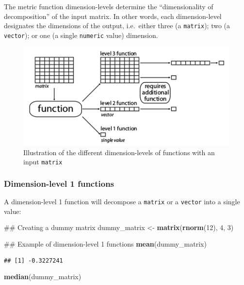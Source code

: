 \documentclass[]{book}
\newenvironment{Shaded}{\begin{snugshade}}{\end{snugshade}}
\newcommand{\KeywordTok}[1]{\textcolor[rgb]{0.13,0.29,0.53}{\textbf{#1}}}
\newcommand{\DecValTok}[1]{\textcolor[rgb]{0.00,0.00,0.81}{#1}}
\newcommand{\StringTok}[1]{\textcolor[rgb]{0.31,0.60,0.02}{#1}}
\newcommand{\NormalTok}[1]{#1}
\theoremstyle{definition}
\theoremstyle{definition}
\theoremstyle{remark}
\begin{document}
The metric function dimension-levels determine the ``dimensionality of
decomposition'' of the input matrix. In other words, each
dimension-level designates the dimensions of the output, i.e.~either
three (a \texttt{matrix}); two (a \texttt{vector}); or one (a single
\texttt{numeric} value) dimension.

\begin{figure}
\centering
\includegraphics{dispRity_fun.png}
\caption{Illustration of the different dimension-levels of functions
with an input \texttt{matrix}}
\end{figure}

\subsubsection{Dimension-level 1
functions}\label{dimension-level-1-functions}

A dimension-level 1 function will decompose a \texttt{matrix} or a
\texttt{vector} into a single value:

\begin{Shaded}
\begin{Highlighting}[]
\NormalTok{## Creating a dummy matrix}
\NormalTok{dummy_matrix <-}\StringTok{ }\KeywordTok{matrix}\NormalTok{(}\KeywordTok{rnorm}\NormalTok{(}\DecValTok{12}\NormalTok{), }\DecValTok{4}\NormalTok{, }\DecValTok{3}\NormalTok{)}

\NormalTok{## Example of dimension-level 1 functions}
\KeywordTok{mean}\NormalTok{(dummy_matrix)}
\end{Highlighting}
\end{Shaded}

\begin{verbatim}
## [1] -0.3227241
\end{verbatim}

\begin{Shaded}
\begin{Highlighting}[]
\KeywordTok{median}\NormalTok{(dummy_matrix)}
\end{Highlighting}
\end{Shaded}
\end{document}
